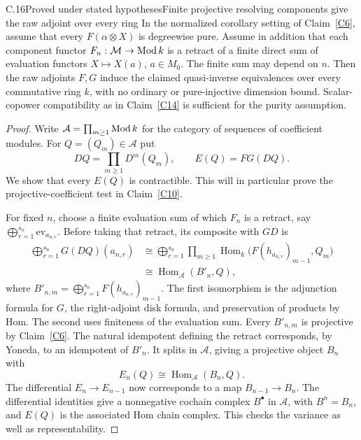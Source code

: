\begin{claim}{C.16}{Proved under stated hypotheses}{Finite projective resolving components give the raw adjoint over every ring}\label{C16}
In the normalized corollary setting of Claim~\ref{C6}, assume that every $F(\alpha\otimes X)$ is degreewise pure. Assume in addition that each component functor $F_n:\mathcal M\to\operatorname{Mod} k$ is a retract of a finite direct sum of evaluation functors $X\mapsto X(a)$, $a\in M_0$. The finite sum may depend on $n$. Then the raw adjoints $F,G$ induce the claimed quasi-inverse equivalences over every commutative ring $k$, with no ordinary or pure-injective dimension bound. Scalar-copower compatibility as in Claim~\ref{C14} is sufficient for the purity assumption.
\end{claim}
\begin{proof}
Write $\mathcal A=\prod_{m\geq1}\operatorname{Mod} k$ for the category of sequences of coefficient modules. For $Q=(Q_m)\in\mathcal A$ put
\[
 DQ=\prod_{m\geq1}D^m(Q_m),\qquad E(Q)=FG(DQ).
\]
We show that every $E(Q)$ is contractible. This will in particular prove the projective-coefficient test in Claim~\ref{C10}.

For fixed $n$, choose a finite evaluation sum of which $F_n$ is a retract, say $\bigoplus_{r=1}^{s_n}\mathrm{ev}_{a_{n,r}}$. Before taking that retract, its composite with $G D$ is
\[
 \begin{aligned}
 \bigoplus_{r=1}^{s_n}G(DQ)(a_{n,r})
 &\cong\bigoplus_{r=1}^{s_n}
   \prod_{m\geq1}\operatorname{Hom}_k
        \bigl(F(h_{a_{n,r}})_{m-1},Q_m\bigr)\\
 &\cong\operatorname{Hom}_{\mathcal A}(B'_n,Q),
 \end{aligned}
\]
where $B'_{n,m}=\bigoplus_{r=1}^{s_n}F(h_{a_{n,r}})_{m-1}$. The first isomorphism is the adjunction formula for $G$, the right-adjoint disk formula, and preservation of products by Hom. The second uses finiteness of the evaluation sum. Every $B'_{n,m}$ is projective by Claim~\ref{C6}. The natural idempotent defining the retract corresponds, by Yoneda, to an idempotent of $B'_n$. It splits in $\mathcal A$, giving a projective object $B_n$ with
\[
 E_n(Q)\cong\operatorname{Hom}_{\mathcal A}(B_n,Q).
\]
The differential $E_n\to E_{n-1}$ now corresponds to a map $B_{n-1}\to B_n$. The differential identities give a nonnegative cochain complex $B^\bullet$ in $\mathcal A$, with $B^n=B_n$, and $E(Q)$ is the associated Hom chain complex. This checks the variance as well as representability.


\end{proof}
